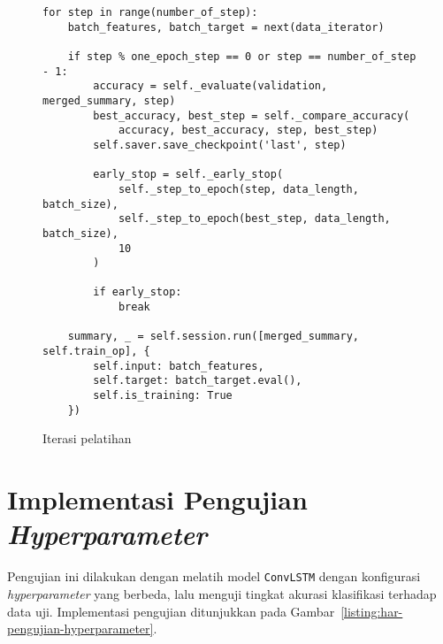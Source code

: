 \begin{figure}[h]
\begin{verbatim}
for step in range(number_of_step):
    batch_features, batch_target = next(data_iterator)

    if step % one_epoch_step == 0 or step == number_of_step - 1:
        accuracy = self._evaluate(validation, merged_summary, step)
        best_accuracy, best_step = self._compare_accuracy(
            accuracy, best_accuracy, step, best_step)
        self.saver.save_checkpoint('last', step)

        early_stop = self._early_stop(
            self._step_to_epoch(step, data_length, batch_size),
            self._step_to_epoch(best_step, data_length, batch_size),
            10
        )

        if early_stop:
            break

    summary, _ = self.session.run([merged_summary, self.train_op], {
        self.input: batch_features,
        self.target: batch_target.eval(),
        self.is_training: True
    })
\end{verbatim}
\caption{Iterasi pelatihan}
\label{listing:har-iterasi-pelatihan}
\end{figure}

\section{Implementasi Pengujian \textit{Hyperparameter}}

Pengujian ini dilakukan dengan melatih model \texttt{ConvLSTM} dengan konfigurasi \textit{hyperparameter} yang berbeda, lalu menguji tingkat akurasi klasifikasi terhadap data uji. Implementasi pengujian ditunjukkan pada Gambar~\ref{listing:har-pengujian-hyperparameter}.


